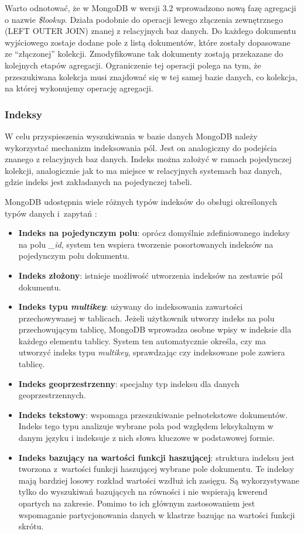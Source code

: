 Warto odnotować, że w MongoDB w wersji 3.2 wprowadzono nową fazę agregacji o nazwie \textit{\$lookup}.
Działa podobnie do operacji lewego złączenia zewnętrznego (LEFT OUTER JOIN) znanej z relacyjnych baz danych.
Do każdego dokumentu wyjściowego zostaje dodane pole z listą dokumentów, które zostały dopasowane ze \enquote{złączonej} kolekcji.
Zmodyfikowane tak dokumenty zostają przekazane do kolejnych etapów agregacji.
Ograniczenie tej operacji polega na tym, że przeszukiwana kolekcja musi znajdować się w tej samej bazie danych, co kolekcja, na której wykonujemy operację agregacji.

\subsubsection{Indeksy}

W celu przyspieszenia wyszukiwania w bazie danych MongoDB należy wykorzystać mechanizm indeksowania pól.
Jest on analogiczny do podejścia znanego z relacyjnych baz danych.
Indeks można założyć w ramach pojedynczej kolekcji, analogicznie jak to ma miejsce w relacyjnych systemach baz danych, gdzie indeks jest zakładanych na pojedynczej tabeli.

MongoDB udostępnia wiele różnych typów indeksów do obsługi określonych typów danych i~zapytań \cite{MongoDBIndexes}:
\begin{itemize}
    \item \textbf{Indeks na pojedynczym polu}: oprócz domyślnie zdefiniowanego indeksy na polu \textit{\_id}, system ten wspiera tworzenie posortowanych indeksów na pojedynczym polu dokumentu.
    \item \textbf{Indeks złożony}: istnieje możliwość utworzenia indeksów na zestawie pól dokumentu.
    \item \textbf{Indeks typu \textit{multikey}}: używany do indeksowania zawartości przechowywanej w tablicach.
    Jeżeli użytkownik utworzy indeks na polu przechowującym tablicę, MongoDB wprowadza osobne wpisy w indeksie dla każdego elementu tablicy.
    System ten automatycznie określa, czy ma utworzyć indeks typu \textit{multikey}, sprawdzając czy indeksowane pole zawiera tablicę.
    \item \textbf{Indeks geoprzestrzenny}: specjalny typ indeksu dla danych geoprzestrzennych.
    \item \textbf{Indeks tekstowy}: wspomaga przeszukiwanie pełnotekstowe dokumentów.
    Indeks tego typu analizuje wybrane pola pod względem leksykalnym w danym języku i indeksuje z nich słowa kluczowe w podstawowej formie.
    \item \textbf{Indeks bazujący na wartości funkcji haszującej}: struktura indeksu jest tworzona z~wartości funkcji haszującej wybrane pole dokumentu.
    Te indeksy mają bardziej losowy rozkład wartości wzdłuż ich zasięgu. 
    Są wykorzystywane tylko do wyszukiwań bazujących na równości i nie wspierają kwerend opartych na zakresie.
    Pomimo to ich głównym zastosowaniem jest wspomaganie partycjonowania danych w klastrze bazując na wartości funkcji skrótu.
\end{itemize}

